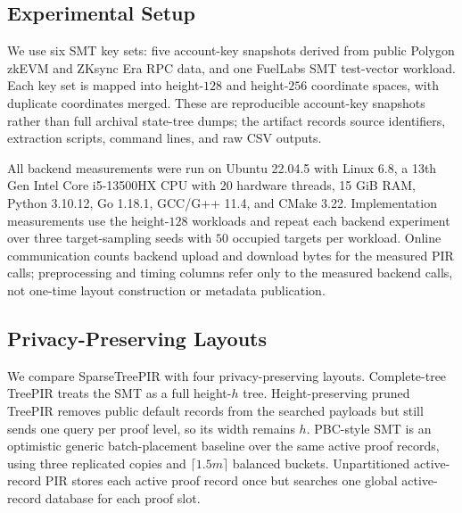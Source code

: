 \subsection{Experimental Setup}

We use six SMT key sets: five account-key snapshots derived from public Polygon zkEVM and ZKsync Era RPC data, and one FuelLabs SMT test-vector workload. Each key set is mapped into height-$128$ and height-$256$ coordinate spaces, with duplicate coordinates merged. These are reproducible account-key snapshots rather than full archival state-tree dumps; the artifact records source identifiers, extraction scripts, command lines, and raw CSV outputs.

All backend measurements were run on Ubuntu 22.04.5 with Linux 6.8, a 13th Gen Intel Core i5-13500HX CPU with 20 hardware threads, 15 GiB RAM, Python 3.10.12, Go 1.18.1, GCC/G++ 11.4, and CMake 3.22. Implementation measurements use the height-$128$ workloads and repeat each backend experiment over three target-sampling seeds with $50$ occupied targets per workload. Online communication counts backend upload and download bytes for the measured PIR calls; preprocessing and timing columns refer only to the measured backend calls, not one-time layout construction or metadata publication.

\subsection{Privacy-Preserving Layouts}

We compare SparseTreePIR with four privacy-preserving layouts. Complete-tree TreePIR treats the SMT as a full height-$h$ tree. Height-preserving pruned TreePIR removes public default records from the searched payloads but still sends one query per proof level, so its width remains $h$. PBC-style SMT is an optimistic generic batch-placement baseline over the same active proof records, using three replicated copies and $\lceil1.5m\rceil$ balanced buckets. Unpartitioned active-record PIR stores each active proof record once but searches one global active-record database for each proof slot.

